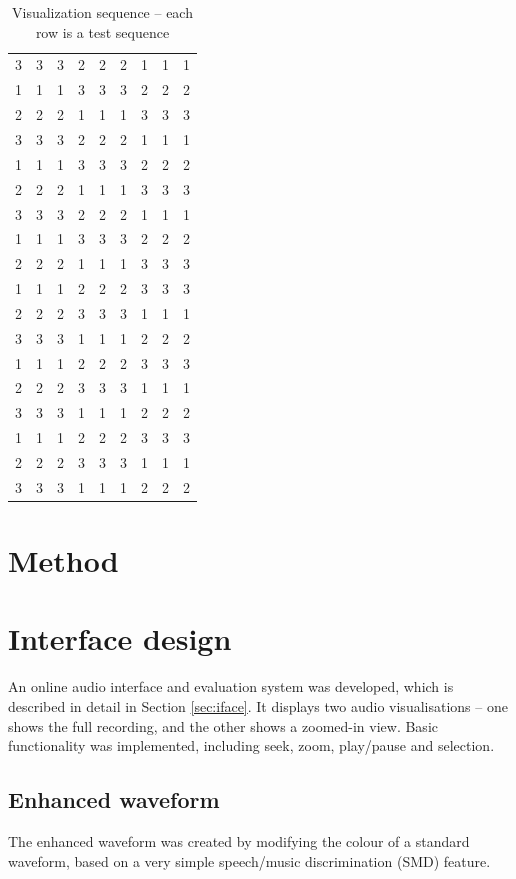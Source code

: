 \begin{table}
{\begin{tabular}{rrrrrrrrr}
      3 & 3 & 3 & 2 & 2 & 2 & 1 & 1 & 1 \\ 
      1 & 1 & 1 & 3 & 3 & 3 & 2 & 2 & 2 \\ 
      2 & 2 & 2 & 1 & 1 & 1 & 3 & 3 & 3 \\ 
      3 & 3 & 3 & 2 & 2 & 2 & 1 & 1 & 1 \\ 
      1 & 1 & 1 & 3 & 3 & 3 & 2 & 2 & 2 \\ 
      2 & 2 & 2 & 1 & 1 & 1 & 3 & 3 & 3 \\ 
      3 & 3 & 3 & 2 & 2 & 2 & 1 & 1 & 1 \\ 
      1 & 1 & 1 & 3 & 3 & 3 & 2 & 2 & 2 \\ 
      2 & 2 & 2 & 1 & 1 & 1 & 3 & 3 & 3 \\ 
      1 & 1 & 1 & 2 & 2 & 2 & 3 & 3 & 3 \\ 
      2 & 2 & 2 & 3 & 3 & 3 & 1 & 1 & 1 \\ 
      3 & 3 & 3 & 1 & 1 & 1 & 2 & 2 & 2 \\ 
      1 & 1 & 1 & 2 & 2 & 2 & 3 & 3 & 3 \\ 
      2 & 2 & 2 & 3 & 3 & 3 & 1 & 1 & 1 \\ 
      3 & 3 & 3 & 1 & 1 & 1 & 2 & 2 & 2 \\ 
      1 & 1 & 1 & 2 & 2 & 2 & 3 & 3 & 3 \\ 
      2 & 2 & 2 & 3 & 3 & 3 & 1 & 1 & 1 \\ 
      3 & 3 & 3 & 1 & 1 & 1 & 2 & 2 & 2 \\ 
    \end{tabular}
    \caption{Visualization sequence -- each row is a test sequence}
    \label{tab:visseq}
  }
\end{table}

\section{Method}

\section{Interface design}
An online audio interface and evaluation system was developed, which is
described in detail in Section \ref{sec:iface}. It displays two audio
visualisations -- one shows the full recording, and the other shows a zoomed-in
view. Basic functionality was implemented, including seek, zoom, play/pause and
selection.

\subsection{Enhanced waveform}\label{sec:studywaveform}
The enhanced waveform was created by modifying the colour of a standard
waveform, based on a very simple speech/music discrimination (SMD) feature.

